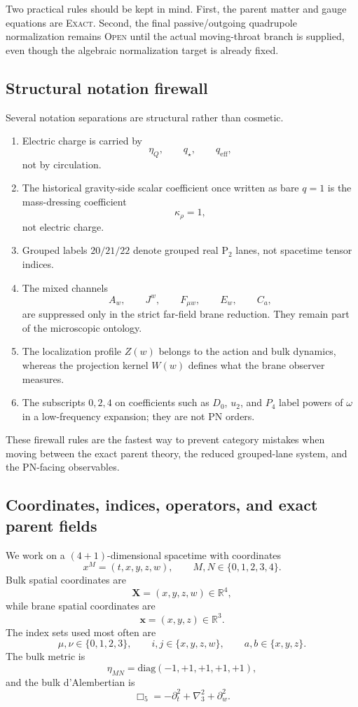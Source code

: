 \documentclass[11pt]{article}
\theoremstyle{definition}
\newcommand{\Ptwo}{\ensuremath{\mathrm{P}_2}}
\newcommand{\eff}{\mathrm{eff}}
\newcommand{\diag}{\mathrm{diag}}
\begin{document}
Two practical rules should be kept in mind. First, the parent matter and gauge equations are \textsc{Exact}. Second, the final passive/outgoing quadrupole normalization remains \textsc{Open} until the actual moving-throat branch is supplied, even though the algebraic normalization target is already fixed.

\subsection{Structural notation firewall}

Several notation separations are structural rather than cosmetic.
\begin{enumerate}
    \item Electric charge is carried by
    \[
    \eta_Q,\qquad q_\star,\qquad q_{\eff},
    \]
    not by circulation.
    \item The historical gravity-side scalar coefficient once written as bare $q=1$ is the mass-dressing coefficient
    \[
    \kappa_\rho=1,
    \]
    not electric charge.
    \item Grouped labels $20/21/22$ denote grouped real $\Ptwo$ lanes, not spacetime tensor indices.
    \item The mixed channels
    \[
    A_w,\qquad J^w,\qquad F_{\mu w},\qquad E_w,\qquad C_a,
    \]
    are suppressed only in the strict far-field brane reduction. They remain part of the microscopic ontology.
    \item The localization profile $Z(w)$ belongs to the action and bulk dynamics, whereas the projection kernel $W(w)$ defines what the brane observer measures.
    \item The subscripts $0,2,4$ on coefficients such as $D_0$, $u_2$, and $P_4$ label powers of $\omega$ in a low-frequency expansion; they are not PN orders.
\end{enumerate}

These firewall rules are the fastest way to prevent category mistakes when moving between the exact parent theory, the reduced grouped-lane system, and the PN-facing observables.

\subsection{Coordinates, indices, operators, and exact parent fields}

We work on a $(4+1)$-dimensional spacetime with coordinates
\[
 x^M=(t,x,y,z,w),
 \qquad
 M,N\in\{0,1,2,3,4\}.
\]
Bulk spatial coordinates are
\[
 \mathbf X=(x,y,z,w)\in\mathbb R^4,
\]
while brane spatial coordinates are
\[
 \mathbf x=(x,y,z)\in\mathbb R^3.
\]
The index sets used most often are
\[
 \mu,\nu\in\{0,1,2,3\},
 \qquad
 i,j\in\{x,y,z,w\},
 \qquad
 a,b\in\{x,y,z\}.
\]
The bulk metric is
\[
 \eta_{MN}=\diag(-1,+1,+1,+1,+1),
\]
and the bulk d'Alembertian is
\[
 \Box_5=-\partial_t^2+\nabla_3^2+\partial_w^2.
\]
\end{document}
